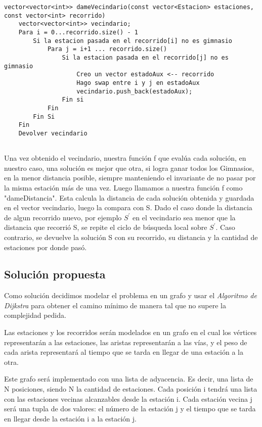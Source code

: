     \begin{codesnippet}
    \begin{verbatim}
vector<vector<int>> dameVecindario(const vector<Estacion> estaciones, const vector<int> recorrido)
    vector<vector<int>> vecindario;
    Para i = 0...recorrido.size() - 1
        Si la estacion pasada en el recorrido[i] no es gimnasio
            Para j = i+1 ... recorrido.size()
                Si la estacion pasada en el recorrido[j] no es gimnasio
                    Creo un vector estadoAux <-- recorrido
                    Hago swap entre i y j en estadoAux
                    vecindario.push_back(estadoAux);
                Fin si
            Fin
        Fin Si
    Fin
    Devolver vecindario
 
    \end{verbatim}
    \end{codesnippet}

    Una vez obtenido el vecindario, nuestra función f que evalúa cada solución, en nuestro caso, una solución es mejor que otra, si logra ganar todos los Gimnasios, en la menor distancia posible, siempre manteniendo el invariante de no pasar por la misma estación más de una vez. Luego llamamos a nuestra función f como "dameDistancia". Esta calcula la distancia de cada solución obtenida y guardada en el vector vecindario, luego la compara con S. Dado el caso donde la distancia de algun recorrido nuevo, por ejemplo $S^{'}$ en el vecindario sea menor que la distancia que recorrió S, se repite el ciclo de búsqueda local sobre $S^{'}$. Caso contrario, se devuelve la solución S con su recorrido, su distancia y la cantidad de estaciones por donde pasó.


    \subsection{Solución propuesta}
    
    \par Como solución decidimos modelar el problema en un grafo y usar el \emph{Algoritmo de Dijkstra} para obtener el camino mínimo de manera tal que no supere la complejidad pedida.

    \par Las estaciones y los recorridos serán modelados en un grafo en el cual los vértices representarán a las estaciones, las aristas representarán a las vías, y el peso de cada arista representará al tiempo que se tarda en llegar de una estación a la otra.
    \par Este grafo será implementado con una lista de adyacencia. Es decir, una lista de N posiciones, siendo N la cantidad de estaciones. Cada posición i tendrá una lista con las estaciones vecinas alcanzables desde la estación i. Cada estación vecina j será una tupla de dos valores: el número de la estación j y el tiempo que se tarda en llegar desde la estación i a la estación j.
    
